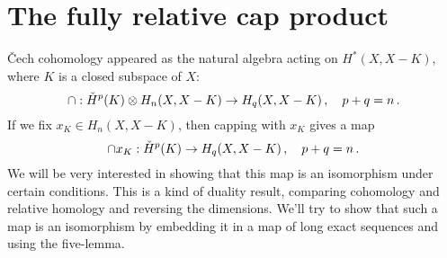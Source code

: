 \section{The fully relative cap product}

\v{C}ech cohomology appeared as the natural algebra acting on $H^*(X,X-K)$,
where $K$ is a closed subspace of $X$: 
\[
\cap:\check{H}^p(K)\otimes H_n(X,X-K)\to H_q(X,X-K)\,,\quad p+q=n\,.
\]
If we fix $x_K\in H_n(X,X-K)$, then capping with $x_K$ gives a map 
\[
\cap x_K:\check{H}^p(K)\to H_q(X,X-K)\,,\quad p+q=n\,. 
\]
We will be very interested in showing that this map is an isomorphism 
under certain conditions. This is a kind of duality result, comparing
cohomology and relative homology and reversing the dimensions. 
We'll try to show that such a map is an isomorphism by embedding it 
in a map of long exact sequences and using the five-lemma. 

